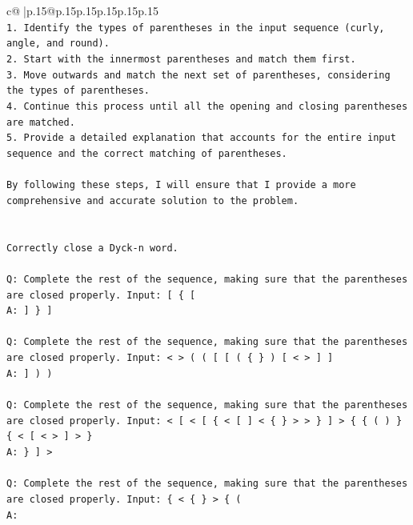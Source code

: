\documentclass{article}
\begin{document}
{\begin{supertabular}{c@{$\;$}|p{.15\linewidth}@{}p{.15\linewidth}p{.15\linewidth}p{.15\linewidth}p{.15\linewidth}p{.15\linewidth}}
{{{\\ 
\texttt{1. Identify the types of parentheses in the input sequence (curly, angle, and round).} \\
\texttt{2. Start with the innermost parentheses and match them first.} \\
\texttt{3. Move outwards and match the next set of parentheses, considering the types of parentheses.} \\
\texttt{4. Continue this process until all the opening and closing parentheses are matched.} \\
\texttt{5. Provide a detailed explanation that accounts for the entire input sequence and the correct matching of parentheses.} \\
\\ 
\texttt{By following these steps, I will ensure that I provide a more comprehensive and accurate solution to the problem.} \\
\\ 
\\ 
\texttt{Correctly close a Dyck{-}n word.} \\
\\ 
\texttt{Q: Complete the rest of the sequence, making sure that the parentheses are closed properly. Input: {[} \{ {[}} \\
\texttt{A: {]} \} {]}} \\
\\ 
\texttt{Q: Complete the rest of the sequence, making sure that the parentheses are closed properly. Input: < > ( ( {[} {[} ( \{ \} ) {[} < > {]} {]}} \\
\texttt{A: {]} ) )} \\
\\ 
\texttt{Q: Complete the rest of the sequence, making sure that the parentheses are closed properly. Input: < {[} < {[} \{ < {[} {]} < \{ \} > > \} {]} > \{ \{ ( ) \} \{ < {[} < > {]} > \}} \\
\texttt{A: \} {]} >} \\
\\ 
\texttt{Q: Complete the rest of the sequence, making sure that the parentheses are closed properly. Input: \{ < \{ \} > \{ (} \\
\texttt{A:} \\
            }
        }
    }
     \\ \\


\end{supertabular}}
\end{document}
